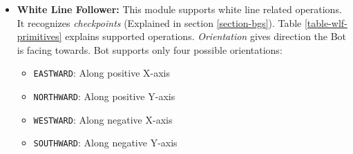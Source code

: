 \documentclass[a4paper, 12pt]{article}
\begin{document}
\begin{itemize}
  \item \textbf{White Line Follower:} This module supports white line related operations. It recognizes 
  \emph{checkpoints} (Explained in section \ref{section-bgs}). Table \ref{table-wlf-primitives} explains 
  supported operations. \emph{Orientation} gives direction the Bot is facing towards.
  Bot supports only four possible orientations:
  \begin{itemize}
   \item \texttt{EASTWARD}: Along positive X-axis
   \item \texttt{NORTHWARD}: Along positive Y-axis
   \item \texttt{WESTWARD}: Along negative X-axis
   \item \texttt{SOUTHWARD}: Along negative Y-axis
  \end{itemize}

\end{itemize}
\end{document}

